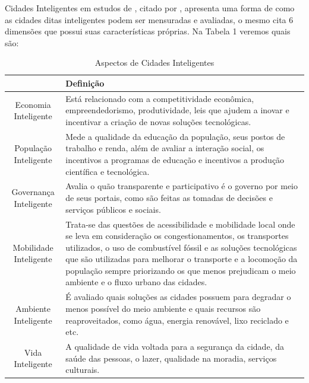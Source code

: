 Cidades Inteligentes em estudos de , citado  por , apresenta uma forma de como as cidades ditas inteligentes podem ser mensuradas e avaliadas, o mesmo cita 6 dimensões que possui suas características próprias. Na Tabela 1 veremos quais são:


\begin{table}[h]
\centering
\caption{Aspectos de Cidades Inteligentes}
\vspace{0.2cm}
\begin{tabular}{cp{12cm}}
\hline
 & Definição \\
\hline
\vspace{0.3cm}
Economia Inteligente & 
Está relacionado com a competitividade econômica, empreendedorismo, produtividade, leis que ajudem a inovar e incentivar a criação de novas soluções tecnológicas. \\
\hline
\vspace{0.3cm}
População Inteligente & 
Mede a qualidade da educação da população, seus postos de trabalho e renda, além de avaliar a interação social, os incentivos a programas de educação e incentivos a produção científica e tecnológica. \\
\hline
\vspace{0.3cm}
Governança Inteligente & Avalia o quão transparente e participativo é o governo por meio de seus portais, como são feitas as tomadas de decisões e serviços públicos e sociais.\\
\hline
\vspace{0.3cm}
Mobilidade Inteligente & Trata-se das questões de acessibilidade e mobilidade local onde se leva em consideração os congestionamentos, os transportes utilizados, o uso de combustível fóssil e as soluções tecnológicas que são utilizadas para melhorar o transporte e a locomoção da população sempre priorizando os que menos prejudicam o meio ambiente e o fluxo urbano das cidades.\\
\hline
\vspace{0.3cm}
Ambiente Inteligente &
É avaliado quais soluções as cidades possuem para degradar o menos possível do meio ambiente e quais recursos são reaproveitados, como água, energia renovável, lixo reciclado e etc. \\
\hline
Vida Inteligente &
A qualidade de vida voltada para a segurança da cidade, da saúde das pessoas, o lazer, qualidade na moradia, serviços culturais.

\end{tabular}
\end{table}


